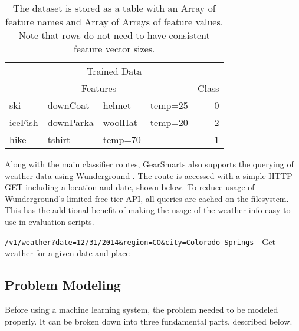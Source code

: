 \begin{table}
    \begin{tabular}{llllr}
        \hline
        \multicolumn{5}{c}{Trained Data} \\
        \multicolumn{4}{c}{Features} & Class \\
        \hline
        ski     & downCoat  & helmet      & temp=25  & 0 \\
        iceFish & downParka  & woolHat      & temp=20  & 2 \\
        hike    & tshirt & temp=70  & & 1 \\
        \hline
    \end{tabular}
    \caption{The dataset is stored as a table with an Array of feature names and Array of Arrays of feature values. Note that rows
    do not need to have consistent feature vector sizes.}
    \label{table:datarow}
\end{table}

Along with the main classifier routes, GearSmarts also supports the querying of weather data using Wunderground \cite{wunderground}.
The route is accessed with a simple HTTP GET including a location and date, shown below. To reduce usage of Wunderground's limited
free tier API, all queries are cached on the filesystem. This has the additional benefit of making the usage of the weather info
easy to use in evaluation scripts.

\begin{description}
    \item{\texttt{/v1/weather?date=12/31/2014\&region=CO\&city=Colorado Springs}} - Get weather for a given date and place
\end{description}

\subsection{Problem Modeling}
Before using a machine learning system, the problem needed to be modeled properly. It can be broken down into three
fundamental parts, described below.

